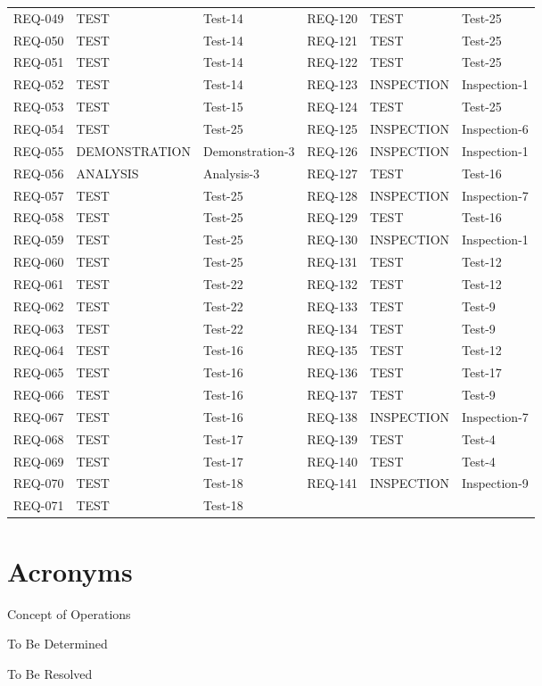 \documentclass[11pt,a4paper]{article}
\begin{document}
{\begin{xltabular}{\textwidth}{@{}lll@{\hspace{1.2em}}lll@{}}
REQ-049 & TEST & Test-14 & REQ-120 & TEST & Test-25 \\
REQ-050 & TEST & Test-14 & REQ-121 & TEST & Test-25 \\
REQ-051 & TEST & Test-14 & REQ-122 & TEST & Test-25 \\
REQ-052 & TEST & Test-14 & REQ-123 & INSPECTION & Inspection-1 \\
REQ-053 & TEST & Test-15 & REQ-124 & TEST & Test-25 \\
REQ-054 & TEST & Test-25 & REQ-125 & INSPECTION & Inspection-6 \\
REQ-055 & DEMONSTRATION & Demonstration-3 & REQ-126 & INSPECTION & Inspection-1 \\
REQ-056 & ANALYSIS & Analysis-3 & REQ-127 & TEST & Test-16 \\
REQ-057 & TEST & Test-25 & REQ-128 & INSPECTION & Inspection-7 \\
REQ-058 & TEST & Test-25 & REQ-129 & TEST & Test-16 \\
REQ-059 & TEST & Test-25 & REQ-130 & INSPECTION & Inspection-1 \\
REQ-060 & TEST & Test-25 & REQ-131 & TEST & Test-12 \\
REQ-061 & TEST & Test-22 & REQ-132 & TEST & Test-12 \\
REQ-062 & TEST & Test-22 & REQ-133 & TEST & Test-9 \\
REQ-063 & TEST & Test-22 & REQ-134 & TEST & Test-9 \\
REQ-064 & TEST & Test-16 & REQ-135 & TEST & Test-12 \\
REQ-065 & TEST & Test-16 & REQ-136 & TEST & Test-17 \\
REQ-066 & TEST & Test-16 & REQ-137 & TEST & Test-9 \\
REQ-067 & TEST & Test-16 & REQ-138 & INSPECTION & Inspection-7 \\
REQ-068 & TEST & Test-17 & REQ-139 & TEST & Test-4 \\
REQ-069 & TEST & Test-17 & REQ-140 & TEST & Test-4 \\
REQ-070 & TEST & Test-18 & REQ-141 & INSPECTION & Inspection-9 \\
REQ-071 & TEST & Test-18 &  & &  \\
\bottomrule
\end{xltabular}}
\addtocounter{table}{-1}

\section{Acronyms}
\begin{description}[leftmargin=2.2cm]
\item[ConOps] Concept of Operations
\item[TBD] To Be Determined
\item[TBR] To Be Resolved
\end{description}
\end{document}
